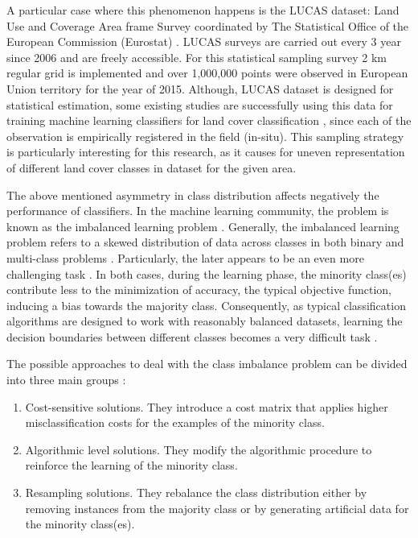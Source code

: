 \documentclass[remotesensing,article,submit,moreauthors,pdftex]{Definitions/mdpi}
\begin{document}
A particular case where this phenomenon happens is the LUCAS dataset: Land Use
and Coverage Area frame Survey coordinated by The Statistical Office of the
European Commission (Eurostat) \cite{LUCAS2015C1}. LUCAS surveys are carried 
out every 3 year since 2006 and are freely accessible.  For this statistical
sampling survey 2 km regular grid is implemented and over 1,000,000 points were
observed in European Union territory for the year of 2015. Although, LUCAS
dataset is designed for  statistical estimation, some existing studies are
successfully using this data for training machine learning classifiers for land
cover classification \cite{Pflugmacher2019, Mack2017}, since each of the
observation is empirically registered in the field (in-situ). This sampling
strategy is particularly interesting for this research, as it causes for uneven
representation of different land cover classes in dataset for the given area.

The above mentioned asymmetry in class distribution affects negatively the
performance of classifiers. In the machine learning community, the problem is
known as the imbalanced learning problem \cite{Chawla2004}. Generally, the
imbalanced learning problem refers to a skewed distribution of data across
classes in both binary and multi-class problems \cite{Abdi2016}. Particularly,
the later appears to be an even more challenging task \cite{Garcia2018}. In both
cases, during the learning phase, the minority class(es) contribute less to the
minimization of accuracy, the typical objective function, inducing a bias
towards the majority class. Consequently, as typical classification algorithms
are designed to work with reasonably balanced datasets, learning the decision
boundaries between different classes becomes a very difficult task
\cite{Saez2016}.

The possible approaches to deal with the class imbalance problem can be divided
into three main groups \cite{Fernandez2013}:

\begin{enumerate}

	\item Cost-sensitive solutions. They introduce a cost matrix that applies
	higher misclassification costs for the examples of the minority class.

	\item Algorithmic level solutions. They modify the algorithmic procedure to
	reinforce the learning of the minority class.

	\item Resampling solutions. They rebalance the class distribution either by
	removing instances from the majority class or by generating artificial data
	for the minority class(es).

\end{enumerate}
\end{document}
